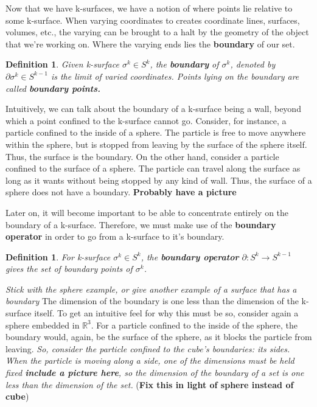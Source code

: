 \documentclass{book}
\newtheorem{defn}[equation]{Definition}
\begin{document}
Now that we have k-surfaces, we have a notion of where points lie relative to some k-surface. When varying coordinates to creates coordinate lines, surfaces, volumes, etc., the varying can be brought to a halt by the geometry of the object that we're working on. Where the varying ends lies the \textbf{boundary} of our set. 

\begin{defn}
	Given k-surface $\sigma^k \in S^k$, the \textbf{boundary} of $\sigma^k$, denoted by $\partial\sigma^k \in S^{k-1}$ is the limit of varied coordinates. Points lying on the boundary are called \textbf{boundary points.}
\end{defn}



Intuitively, we can talk about the boundary of a k-surface being a wall, beyond which a point confined to the k-surface cannot go. Consider, for instance, a particle confined to the inside of a sphere. The particle is free to move anywhere within the sphere, but is stopped from leaving by the surface of the sphere itself. Thus, the surface is the boundary. On the other hand, consider a particle confined to the surface of a sphere. The particle can travel along the surface as long as it wants without being stopped by any kind of wall. Thus, the surface of a sphere does not have a boundary. \textbf{Probably have a picture}

Later on, it will become important to be able to concentrate entirely on the boundary of a k-surface. Therefore, we must make use of the \textbf{boundary operator} in order to go from a k-surface to it's boundary. 

\begin{defn}
	For k-surface $\sigma^k \in S^k$, the \textbf{boundary operator} $\partial : S^k \to S^{k-1}$ gives the set of boundary points of $\sigma^k$. 
\end{defn}


\textit{Stick with the sphere example, or give another example of a surface that has a boundary}
The dimension of the boundary is one less than the dimension of the k-surface itself. To get an intuitive feel for why this must be so, consider again a sphere embedded in $\mathbb{R}^3$. For a particle confined to the inside of the sphere, the boundary would, again, be the surface of the sphere, as it blocks the particle from leaving. \emph{So, consider the particle confined to the cube's boundaries: its sides. When the particle is moving along a side, one of the dimensions must be held fixed \textbf{include a picture here}, so the dimension of the boundary of a set is one less than the dimension of the set. } (\textbf{Fix this in light of sphere instead of cube})
\end{document}
